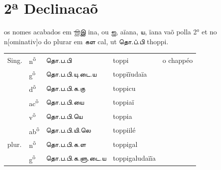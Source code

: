 \documentclass[12pt,a4paper]{scrbook}
\begin{document}
      \chapter*{2ª Declinacaõ}
    
      

os nomes acabados em \sout{\textcolor{gray}{இ}}இ ina, ou ஐ, aïana, ய, ïana 
            vaõ polla 2° et no n[ominativ]o do plurar em கள cal, 
            ut தொ.ப்.பி thoppi.
        
      
\begin{tabular}{lllll}
    
        
          Sing. &
          n\textsuperscript{õ} &
          தொ.ப.பி &
          toppi &
          o chappéo \\
    
        
    
        
           &
          g\textsuperscript{õ} &
          தொ.ப.பி.யு.டை.ய &
          toppïïudaïa &
           \\
    
        
    
        
           &
          d\textsuperscript{õ} &
          தொ.ப.பி.க.கு &
          toppicu &
           \\
    
        
    
        
           &
          ac\textsuperscript{õ} &
          தொ.ப.பி.யை &
          toppiaï &
           \\
    
        
    
        
           &
          v\textsuperscript{õ} &
          தொ.ப.பி.யெ &
          toppia &
           \\
    
        
    
        
           &
          ab\textsuperscript{õ} &
          தொ.ப.பி.யி.லெ &
          toppiilé &
           \\
    
        
    
        
          plur. &
          n\textsuperscript{õ} &
          தொ.ப.பி.க.ள &
          toppigal &
           \\
    
        
    
        
           &
          g\textsuperscript{õ} &
          தொ.ப.பி.க.ளு.டை.ய &
          toppigaludaïïa &
           \\
    

\end{tabular}
\end{document}
